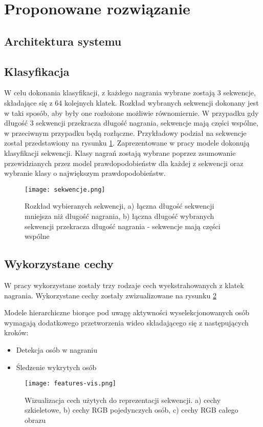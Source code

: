 \newpage
\section{Proponowane rozwiązanie}
\subsection{Architektura systemu}

\subsection{Klasyfikacja}\label{klasyfikacja}
W celu dokonania klasyfikacji, z każdego nagrania wybrane zostają 3 sekwencje, składające się z 64 kolejnych klatek.
Rozkład wybranych sekwencji dokonany jest w taki sposób, aby były one rozłożone możliwie równomiernie. W przypadku gdy
długość
3 sekwencji przekracza długość nagrania, sekwencje mają części wspólne, w przeciwnym przypadku będą rozłączne.
Przykładowy podział na sekwencje został przedstawiony na rysunku \ref{fig:sekwencje}. Zaprezentowane w pracy modele
dokonują klasyfikacji sekwencji. Klasy nagrań zostają wybrane poprzez zsumowanie przewidzianych przez model
prawdopodobieństw dla każdej z sekwencji oraz wybranie klasy o największym prawdopodobieństw.
\begin{figure}[!h]
    \centering \texttt{[image: sekwencje.png]}
    \caption{Rozkład wybieranych sekwencji, a) łączna długość sekwencji mniejsza niż długość nagrania, b) łączna długość wybranych sekwencji przekracza długość nagrania - sekwencje mają części wspólne}
    \label{fig:sekwencje}
\end{figure}
\subsection{Wykorzystane cechy}
W pracy wykorzystane zostały trzy rodzaje cech wyekstrahowanych z klatek nagrania. Wykorzystane cechy zostały zwizualizowane na rysunku \ref{fig:wiz-cech}

Modele hierarchiczne biorące pod
uwagę aktywności wyselekcjonowanych osób wymagają dodatkowego przetworzenia wideo składającego się z następujących
kroków: \begin{itemize}
\item Detekcja osób w nagraniu
\item Śledzenie wykrytych osób
\end{itemize}
\begin{figure}[!h]
    \centering \texttt{[image: features-vis.png]}
    \caption{Wizualizacja cech użytych do reprezentacji sekwencji. a) cechy szkieletowe, b) cechy RGB pojedynczych osób, c) cechy RGB całego obrazu}
    \label{fig:wiz-cech}
\end{figure}
